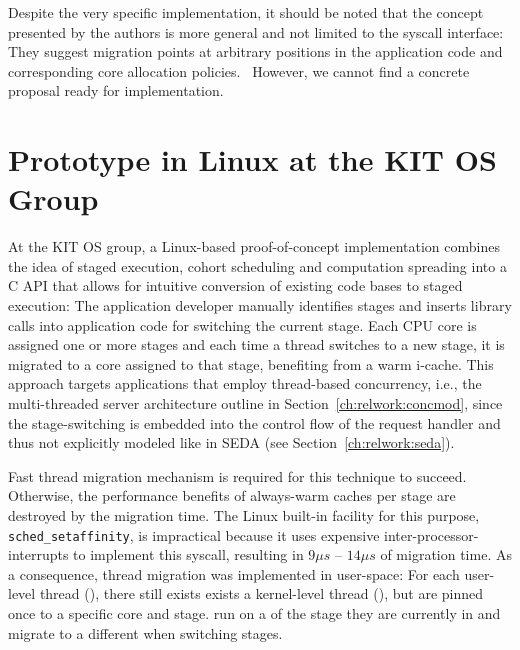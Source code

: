 \documentclass[12pt,a4paper]{book}
\begin{document}
Despite the very specific implementation, it should be noted that the concept presented by the authors is more general and not limited to the syscall interface:
They suggest migration points at arbitrary positions in the application code and corresponding core allocation policies.~\cite{compspr}
However, we cannot find a concrete proposal ready for implementation.


\section{Prototype in Linux at the KIT OS Group}\label{ch:relwork:kitpoc}
\NewDocumentCommand{\klt}{}{\textsc{klt}\xspace}
\NewDocumentCommand{\klts}{}{\textsc{klt}s\xspace}
\NewDocumentCommand{\ult}{}{\textsc{ult}\xspace}
\NewDocumentCommand{\ults}{}{\textsc{ult}s\xspace}
At the KIT OS group, a Linux-based proof-of-concept implementation combines the idea of staged execution, cohort scheduling and computation spreading into a C API that allows for intuitive conversion of existing code bases to staged execution:
The application developer manually identifies stages and inserts library calls into application code for switching the current stage.
Each CPU core is assigned one or more stages and each time a thread switches to a new stage, it is migrated to a core assigned to that stage, benefiting from a warm i-cache.
This approach targets applications that employ thread-based concurrency, i.e., the multi-threaded server architecture outline in Section~\ref{ch:relwork:concmod}, since the stage-switching is embedded into the control flow of the request handler and thus not explicitly modeled like in SEDA (see Section~\ref{ch:relwork:seda}).

Fast thread migration mechanism is required for this technique to succeed.
Otherwise, the performance benefits of always-warm caches per stage are destroyed by the migration time.
The Linux built-in facility for this purpose, \texttt{sched\_setaffinity}, is impractical because it uses
expensive inter-processor-interrupts to implement this syscall, resulting in $9\mu s$ -- $14\mu s$ of migration time.
As a consequence, thread migration was implemented in user-space:
For each user-level thread (\ult), there still exists exists a kernel-level thread (\klt),
but \klts are pinned once to a specific core and stage.
\ults run on a \klt of the stage they are currently in and migrate to a different \klt when switching stages.~\cite{sodaspr}%
\end{document}
